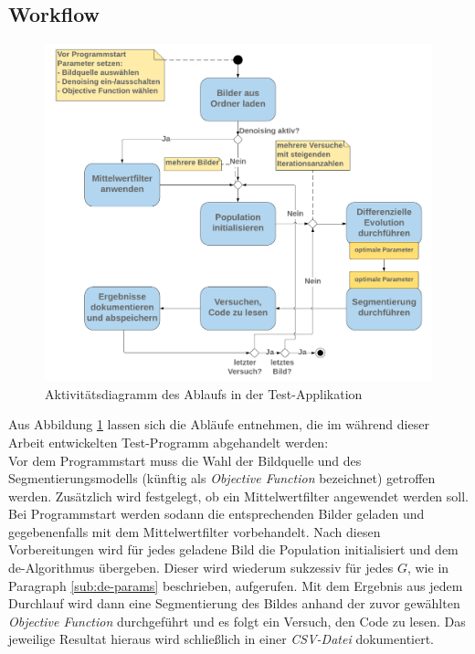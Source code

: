 		\subsection{Workflow}
		\label{sub:workflow}
			\begin{figure}[H]
				\centering
				\includegraphics[width=0.8\linewidth]{diff-evol-activity}
				\caption{Aktivitätsdiagramm des Ablaufs in der Test-Applikation}
				\label{fig:diff-evol-activity}
			\end{figure}
			Aus Abbildung \ref{fig:diff-evol-activity} lassen sich die Abläufe entnehmen, die im während dieser Arbeit entwickelten Test-Programm abgehandelt werden:\\
			Vor dem Programmstart muss die Wahl der Bildquelle und des Segmentierungsmodells (künftig als \textit{Objective Function} bezeichnet) getroffen werden. Zusätzlich wird festgelegt, ob ein Mittelwertfilter angewendet werden soll. \\
			Bei Programmstart werden sodann die entsprechenden Bilder geladen und gegebenenfalls mit dem Mittelwertfilter vorbehandelt. Nach diesen Vorbereitungen wird für jedes geladene Bild die Population initialisiert und dem \gls{de}-Algorithmus übergeben. Dieser wird wiederum sukzessiv für jedes $G$, wie in Paragraph \ref{sub:de-params} beschrieben, aufgerufen. Mit dem Ergebnis aus jedem Durchlauf wird dann eine Segmentierung des Bildes anhand der zuvor gewählten \textit{Objective Function} durchgeführt und es folgt ein Versuch, den Code zu lesen. Das jeweilige Resultat hieraus wird schließlich in einer \textit{CSV-Datei} dokumentiert.
	
